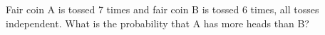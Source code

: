 Fair coin A is tossed 7 times and fair coin B is tossed 6 times, all tosses independent. What is the probability that A has more heads than B?
